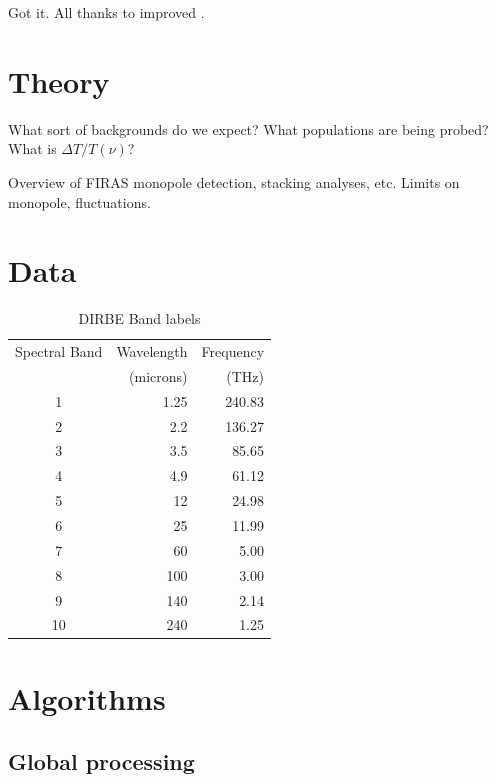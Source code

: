 \documentclass{aa}
\begin{document}
Got it. All thanks to improved \citet{kelsall1998}.


\section{Theory}

What sort of backgrounds do we expect? What populations are being probed? What is $\Delta T/T(\nu)$?

Overview of FIRAS monopole detection, stacking analyses, etc. Limits on monopole, fluctuations.

\section{Data}

 \begin{table}
\caption{DIRBE Band labels}              %
\label{table:1}      %
\centering                                      %
\begin{tabular}{c r r}          %
\hline\hline                        %
Spectral Band & Wavelength 
	& Frequency \\    %
 & (microns) & (THz) \\
\hline                                   %
	1 & 1.25  & 240.83\\      %
	2 & 2.2   & 136.27\\
	3 & 3.5   & 85.65\\
	4 & 4.9   & 61.12\\
	5 & 12    & 24.98\\
	6 & 25    & 11.99\\
	7 & 60    & 5.00 \\
	8 & 100   & 3.00 \\
	9 & 140   & 2.14 \\
	10 & 240  & 1.25\\
\hline                                             %
\end{tabular}
\end{table}

\section{Algorithms}

\subsection{Global processing}
\end{document}
